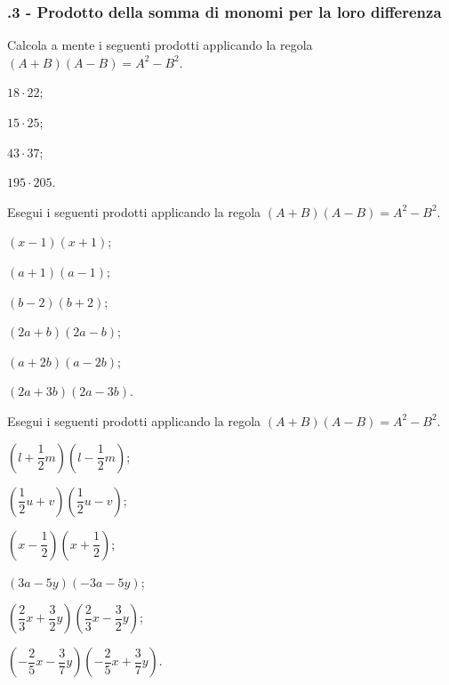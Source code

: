 \subsubsection*{\thechapter.3 - Prodotto della somma di monomi per la loro differenza}
\begin{esercizio}
 \label{ese:12.16}
 Calcola a mente i seguenti prodotti applicando la regola $(A+B)(A-B)=A^2-B^2$.
 \begin{multicols}{4}
\begin{enumeratea}
 \item $18\cdot 22$;
 \item $15\cdot 25$;
 \item $43\cdot 37$;
 \item $195\cdot 205$.
\end{enumeratea}
\end{multicols}
\end{esercizio}

\begin{esercizio}
 \label{ese:12.17}
Esegui i seguenti prodotti applicando la regola
$\left(A+B\right)\left(A-B\right)=A^{2}-B^{2}$.
 \begin{multicols}{2}
\begin{enumeratea}
 \item $\left(x-1\right)\left(x+1\right)$;
 \item $\left(a+1\right)\left(a-1\right)$;
 \item $\left(b-2\right)\left(b+2\right)$;
 \item $\left(2a+b\right)\left(2a-b\right)$;
 \item $\left(a+2b\right)\left(a-2b\right)$;
 \item $\left(2a+3b\right)\left(2a-3b\right)$.
\end{enumeratea}
\end{multicols}
\end{esercizio}

\begin{esercizio}
 \label{ese:12.18}
Esegui i seguenti prodotti applicando la regola
$\left(A+B\right)\left(A-B\right)=A^{2}-B^{2}$.
 \begin{multicols}{2}
\begin{enumeratea}
 \item $\left(l+\dfrac{1}{2}m\right)\left(l-\dfrac{1}{2}m\right)$;
 \item $\left(\dfrac{1}{2}u+v\right)\left(\dfrac{1}{2}u-v\right)$;
 \item $\left(x-\dfrac{1}{2}\right)\left(x+\dfrac{1}{2}\right)$;
 \item $\left(3a-5y\right)\left(-3a-5y\right)$;
 \item $\left(\dfrac{2}{3}x+\dfrac{3}{2}y\right)\left(\dfrac{2}{3}x-\dfrac{3}{2}y\right)$;
 \item $\left(-{\dfrac{2}{5}}x-\dfrac{3}{7}y\right)\left(-{\dfrac{2}{5}}x+\dfrac{3}{7}y\right)$.
\end{enumeratea}
\end{multicols}
\end{esercizio}

